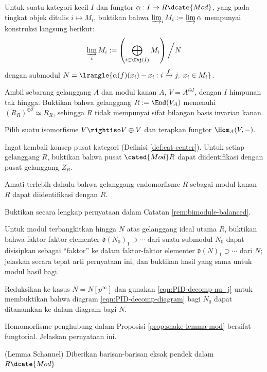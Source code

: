\begin{Exercises}
	\item Untuk suatu kategori kecil $I$ dan fungtor $\alpha: I \to R\dcate{Mod}$, yang pada tingkat objek ditulis $i \mapsto M_i$, buktikan bahwa $\varinjlim_i M_i := \varinjlim \alpha$ mempunyai konstruksi langsung berikut:
	\[ \varinjlim_i M_i := \left( \bigoplus_{i \in \Obj(I)} M_i \right) \bigg/N \]
	dengan submodul $N = \lrangle{ \alpha(f)(x_i) - x_i : i \xrightarrow{f} j, \;  x_i \in M_i }$.
	\item Ambil sebarang gelanggang $A$ dan modul kanan $A$, $V = A^{\oplus I}$, dengan $I$ himpunan tak hingga. Buktikan bahwa gelanggang $R := \End(V_A)$ memenuhi $(R_R)^{\oplus 2} \simeq R_R$, sehingga $R$ tidak mempunyai sifat bilangan basis invarian kanan. \begin{hint} Pilih suatu isomorfisme $V \rightiso V \oplus V$ dan terapkan fungtor $\Hom_A(V, -)$.\end{hint}
	\item Ingat kembali konsep pusat kategori (Definisi \ref{def:cat-center}). Untuk setiap gelanggang $R$, buktikan bahwa pusat $\cated{Mod}R$ dapat diidentifikasi dengan pusat gelanggang $Z_R$. \begin{hint} Amati terlebih dahulu bahwa gelanggang endomorfisme $R$ sebagai modul kanan $R$ dapat diidentifikasi dengan $R$.\end{hint}
	\item Buktikan secara lengkap pernyataan dalam Catatan \ref{rem:bimodule-balanced}.
	\item Untuk modul terbangkitkan hingga $N$ atas gelanggang ideal utama $R$, buktikan bahwa faktor-faktor elementer $\mathfrak{d}(N_0)_1 \supset \cdots$ dari suatu submodul $N_0$ dapat disisipkan sebagai ``faktor'' ke dalam faktor-faktor elementer $\mathfrak{d}(N)_1 \supset \cdots$ dari $N$; jelaskan secara tepat arti pernyataan ini, dan buktikan hasil yang sama untuk modul hasil bagi. \begin{hint} Reduksikan ke kasus $N=N[p^\infty]$ dan gunakan \eqref{eqn:PID-decomp-nu_j} untuk membuktikan bahwa diagram \eqref{eqn:PID-decomp-diagram} bagi $N_0$ dapat ditanamkan ke dalam diagram bagi $N$.\end{hint}
	\item Homomorfisme penghubung dalam Proposisi \ref{prop:snake-lemma-mod} bersifat fungtorial. Jelaskan pernyataan ini.
	\item (Lemma Schanuel) Diberikan barisan-barisan eksak pendek dalam $R\dcate{Mod}$
		\begin{gather*}

\end{gather*}
\end{Exercises}
